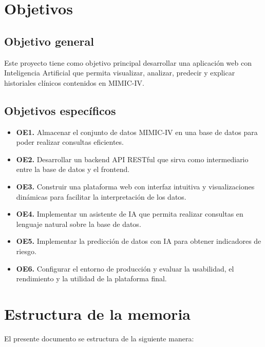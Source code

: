 \section{Objetivos}

\subsection{Objetivo general}

Este proyecto tiene como objetivo principal desarrollar una aplicación web con Inteligencia Artificial que permita visualizar, analizar, predecir y explicar historiales clínicos contenidos en MIMIC-IV.

\subsection{Objetivos específicos}

\begin{itemize}
\item \textbf{OE1.} Almacenar el conjunto de datos MIMIC-IV en una base de datos para poder realizar consultas eficientes.
\item \textbf{OE2.} Desarrollar un backend API RESTful que sirva como intermediario entre la base de datos y el frontend.
\item \textbf{OE3.} Construir una plataforma web con interfaz intuitiva y visualizaciones dinámicas para facilitar la interpretación de los datos.
\item \textbf{OE4.} Implementar un asistente de IA que permita realizar consultas en lenguaje natural sobre la base de datos.
\item \textbf{OE5.} Implementar la predicción de datos con IA para obtener indicadores de riesgo.
\item \textbf{OE6.} Configurar el entorno de producción y evaluar la usabilidad, el rendimiento y la utilidad de la plataforma final.
\end{itemize}

\newpage
\section{Estructura de la memoria}

El presente documento se estructura de la siguiente manera:

